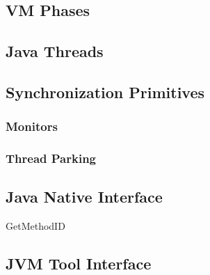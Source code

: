 

\subsection{VM Phases}


\subsection{Java Threads}



\subsection{Synchronization Primitives}



\subsubsection{Monitors}

\subsubsection{Thread Parking}

\subsection{Java Native Interface}


GetMethodID

\subsection{JVM Tool Interface}

